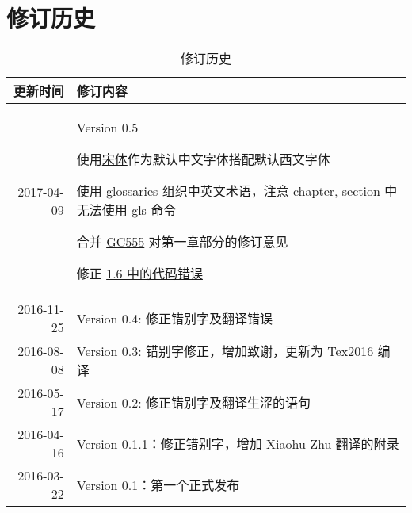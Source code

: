 
\chapter{修订历史}

\begin{table}[h]
  \centering
  \begin{tabularx}{0.9\textwidth}{ r X }
    \toprule
    \textbf{更新时间} & \textbf{修订内容}\\
    \midrule
    2017-04-09 & \vspace{-1.5ex}
									\begin{compactitem}
									\item Version 0.5
                  \item 使用\href{https://www.google.com/get/noto/\#serif-hans}{宋体}作为默认中文字体搭配默认西文字体
                  \item 使用 glossaries 组织中英文术语，注意 chapter, section 中无法使用 gls 命令
									\item 合并 \href{mailto:gengchao@foxmail.com}{GC555} 对第一章部分的修订意见
									\item 修正 \href{https://github.com/zhanggyb/nndl/issues/61}{1.6 中的代码错误}
									\end{compactitem}\\
    \midrule
    2016-11-25 & Version 0.4: 修正错别字及翻译错误 \\
    \midrule
    2016-08-08 & Version 0.3: 错别字修正，增加致谢，更新为 Tex2016 编译 \\
    \midrule
    2016-05-17 & Version 0.2: 修正错别字及翻译生涩的语句 \\
    \midrule
    2016-04-16 & Version 0.1.1：修正错别字，增加 \href{mailto:xhzhu.nju@gmail}{Xiaohu Zhu} 翻译的附录\\
    \midrule
    2016-03-22 & Version 0.1：第一个正式发布\\
    \bottomrule
  \end{tabularx}
  \caption{修订历史}
  \label{table:DocumentChanges}
\end{table}
